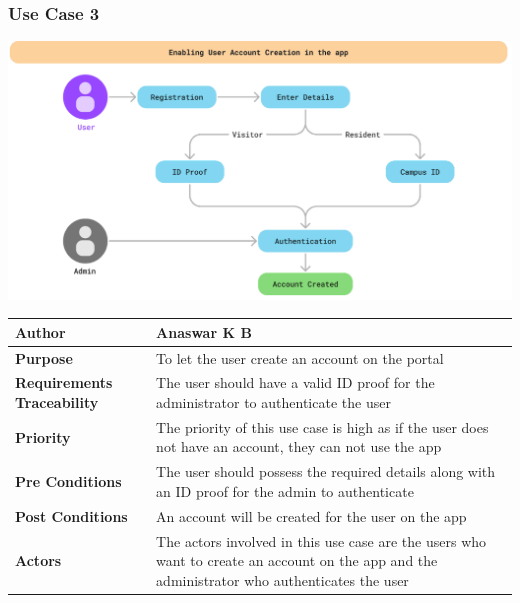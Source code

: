 \documentclass[11pt]{article}
\begin{document}
\subsubsection{Use Case 3}
\begin{center}
\includegraphics*[scale=0.5]{usecase-3.png}
\begin{tabular}{|l|p{10cm}|}
    \hline
    \textbf{Author} & Anaswar K B \\
    \hline
    \textbf{Purpose} &  To let the user create an account on the portal\\
    \hline
    \textbf{Requirements Traceability} & The user should have a valid ID proof for the administrator to authenticate the user\\
    \hline
    \textbf{Priority} & The priority of this use case is high as if the user does not have an account, they can not use the app\\
    \hline
    \textbf{Pre Conditions} &The user should possess the required details along with an ID proof for the admin to authenticate \\
    \hline
    \textbf{Post Conditions} & An account will be created for the user on the app\\
    \hline
    \textbf{Actors} & The actors involved in this use case are the users who want to create an account on the app and the administrator who authenticates the user\\
    \hline
\end{tabular}
\end{center}
\end{document}
